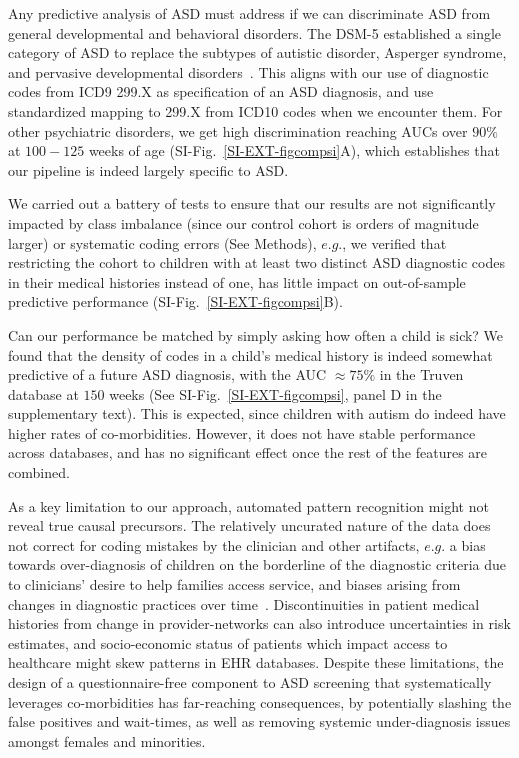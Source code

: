\documentclass[3p,super,numbers,sort&compress,preprint,10pt]{elsarticle}
\begin{document}
Any predictive analysis of ASD must address if we can
discriminate  ASD from  general developmental and behavioral disorders.
The DSM-5 established a single category of ASD to replace
the subtypes of autistic disorder, Asperger syndrome, and pervasive developmental disorders~\cite{hyman2020identification}. This aligns with our use of diagnostic codes from ICD9 299.X as specification of an ASD diagnosis, and use standardized mapping to 299.X from ICD10 codes when we encounter them. For other psychiatric disorders, we get  high discrimination reaching AUCs over $90\%$ at $100 -125$ weeks of age (SI-Fig.~\ref{SI-EXT-figcompsi}A), which establishes that our pipeline is indeed largely specific to ASD.

We carried out a battery of tests to ensure that our results are not significantly impacted by class imbalance (since our control cohort is orders of magnitude larger) or systematic coding errors (See Methods), $e.g.$, we verified that restricting the \treatment cohort to children with at least two  distinct ASD diagnostic codes in their medical histories instead of one, has little impact on  out-of-sample predictive performance (SI-Fig.~\ref{SI-EXT-figcompsi}B).

Can our performance be matched by simply asking how often a child is sick? We  found that the density of  codes in a child's medical history is indeed somewhat  predictive of a future ASD diagnosis, with the AUC  $\approx 75\%$ in the Truven database at $150$ weeks (See SI-Fig.~\ref{SI-EXT-figcompsi}, panel D in the supplementary text). This is expected, since children with autism do indeed have higher rates of co-morbidities. However, it does not have stable  performance across databases, and has no significant effect once the rest of the features are combined.
                
As a key limitation to our approach, automated pattern recognition  might not reveal true causal precursors. The relatively uncurated nature of the  data does not correct for coding mistakes by the clinician and other artifacts, $e.g.$   a bias towards over-diagnosis of  children on the borderline of the diagnostic criteria due to clinicians' desire to help families access service, and biases arising from changes in diagnostic practices over time~\cite{10.1001/jamapsychiatry.2019.1956}. Discontinuities in patient medical histories from change in provider-networks  can also introduce  uncertainties  in risk estimates, and socio-economic status of patients which impact access to healthcare  might skew patterns in EHR databases. Despite these limitations, the design of a questionnaire-free component to ASD screening  that systematically leverages co-morbidities  has far-reaching consequences, by potentially slashing the false positives and wait-times, as well as removing systemic under-diagnosis issues amongst females and minorities. 
\end{document}
